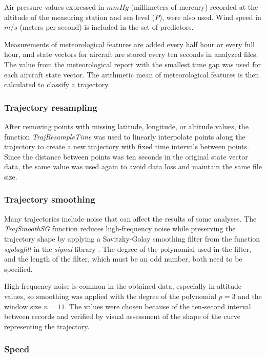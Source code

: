 \let\LaTeXcline\cline\documentclass[sn-mathphys-num]{sn-jnl}\let\cline\LaTeXcline
\begin{document}
Air pressure values expressed in $mmHg$ (millimeters of mercury) recorded at the altitude of the measuring station and sea level ($P$), were also used. Wind speed in $m/s$ (meters per second) is included in the set of predictors.

Measurements of meteorological features are added every half hour or every full hour, and state vectors for aircraft are stored every ten seconds in analyzed files. The value from the meteorological report with the smallest time gap was used for each aircraft state vector. The arithmetic mean of meteorological features is then calculated to classify a trajectory.

\subsubsection{Trajectory resampling}

After removing points with missing latitude, longitude, or altitude values, the function \textit{TrajResampleTime} was used to linearly interpolate points along the trajectory to create a new trajectory with fixed time intervals between points. Since the distance between points was ten seconds in the original state vector data, the same value was used again to avoid data loss and maintain the same file size.
 
\subsubsection{Trajectory smoothing}

Many trajectories include noise that can affect the results of some analyses. The \textit{TrajSmoothSG} function reduces high-frequency noise while preserving the trajectory shape by applying a Savitzky-Golay smoothing filter from the function \textit{sgolayfilt} in the \textit{signal} library \cite{Ligges2006}. The degree of the polynomial used in the filter, and the length of the filter, which must be an odd number, both need to be specified.

High-frequency noise is common in the obtained data, especially in altitude values, so smoothing was applied with the degree of the polynomial $p = 3$ and the window size $n = 11$. The values were chosen because of the ten-second interval between records and verified by visual assessment of the shape of the curve representing the trajectory.

\subsubsection{Speed}
\end{document}
